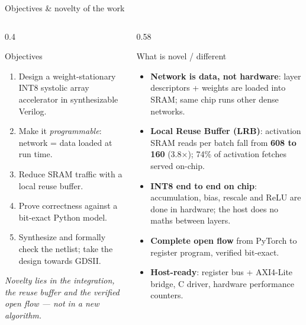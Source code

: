 \documentclass[aspectratio=169,10pt,t]{beamer}
\begin{document}
\begin{frame}{Objectives \& novelty of the work}
  \begin{columns}[T]
    \begin{column}{0.4\textwidth}
      \begin{block}{Objectives}
        \footnotesize
        \begin{enumerate}\setlength{\itemsep}{2pt}
          \item Design a weight-stationary INT8 systolic array accelerator in synthesizable Verilog.
          \item Make it \emph{programmable}: network = data loaded at run time.
          \item Reduce SRAM traffic with a local reuse buffer.
          \item Prove correctness against a bit-exact Python model.
          \item Synthesize and formally check the netlist; take the design towards GDSII.
        \end{enumerate}
      \end{block}
      \scriptsize\emph{Novelty lies in the integration, the reuse buffer and the verified open flow --- not in a new algorithm.}
    \end{column}
    \begin{column}{0.58\textwidth}
      \begin{block}{What is novel / different}
        \footnotesize
        \begin{itemize}\setlength{\itemsep}{2pt}
          \item \textbf{Network is data, not hardware}: layer descriptors + weights are loaded into SRAM; same chip runs other dense networks.
          \item \textbf{Local Reuse Buffer (LRB)}: activation SRAM reads per batch fall from \textbf{608 to 160} (3.8$\times$); 74\% of activation fetches served on-chip.
          \item \textbf{INT8 end to end on chip}: accumulation, bias, rescale and ReLU are done in hardware; the host does no maths between layers.
          \item \textbf{Complete open flow} from PyTorch to register program, verified bit-exact.
          \item \textbf{Host-ready}: register bus + AXI4-Lite bridge, C driver, hardware performance counters.
        \end{itemize}
      \end{block}
    \end{column}
  \end{columns}
\end{frame}
\end{document}
